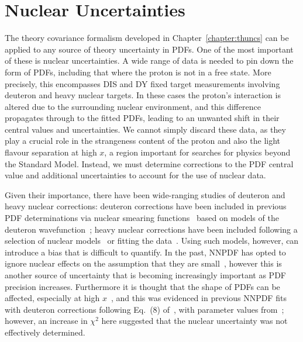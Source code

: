 \chapter{Nuclear Uncertainties}
The theory covariance formalism developed in Chapter~\ref{chapter:thuncs} can be applied to any source of theory uncertainty in PDFs. One of the most important of these is nuclear uncertainties. A wide range of data is needed to pin down the form of PDFs, including that where the proton is not in a free state. More precisely, this encompasses DIS and DY fixed target measurements involving deuteron and heavy nuclear targets. In these cases the proton's interaction is altered due to the surrounding nuclear environment, and this difference propagates through to the fitted PDFs, leading to an unwanted shift in their central values and uncertainties. We cannot simply discard these data, as they play a crucial role in the strangeness content of the proton and also the light flavour separation at high $x$, a region important for searches for physics beyond the Standard Model. Instead, we must determine corrections to the PDF central value and additional uncertainties to account for the use of nuclear data.

Given their importance, there have been wide-ranging studies of deuteron and heavy nuclear corrections: deuteron corrections have been included in previous PDF determinations via nuclear smearing functions~\cite{Owens:2012bv,Ball:2013gsa,Harland-Lang:2014zoa,Accardi:2016qay,
  Alekhin:2017fpf} based on models of the deuteron wavefunction~\cite{Wiringa:1994wb,Melnitchouk:1994rv,Melnitchouk:1996vp,
  Machleidt:2000ge,Gross:2014wqa}; heavy nuclear corrections have been included following a selection of nuclear models~\cite{Harland-Lang:2014zoa,Dulat:2015mca,Alekhin:2017kpj} or fitting the data~\cite{Accardi:2016qay}. Using such models, however, can introduce a bias that is difficult to quantify. In the past, NNPDF has opted to ignore nuclear effects on the assumption that they are small~\cite{Ball:2013gsa, Ball:2014uwa, Ball:2017nwa}, however this is another source of uncertainty that is becoming increasingly important as PDF precision increases. Furthermore it is thought that the shape of PDFs can be affected, especially at high $x$~\cite{Owens:2012bv}, and this was evidenced in previous NNPDF fits with deuteron corrections following Eq.~(8) of~\cite{Harland-Lang:2014zoa}, with parameter values
from~\cite{Martin:2012da}; however, an increase in $\chi^2$ here suggested that the nuclear uncertainty was not effectively determined.
  
